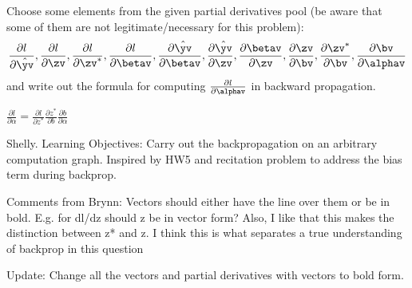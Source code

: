 \begin{parts}
Choose some elements from the given partial derivatives pool (be aware that some of them are not legitimate/necessary for this problem):\\
\begin{align*}
    \frac{\partial{l}}{\partial{\hat{\yv}}},
    \frac{\partial{l}}{\partial{\zv}},
    \frac{\partial{l}}{\partial{\zv^*}}, \frac{\partial{l}}{\partial{\betav}}, 
    \frac{\partial{\hat{\yv}}}{\partial{\betav}}, 
    \frac{\partial{\hat{\yv}}}{\partial{\zv}}, 
    \frac{\partial{\betav}}{\partial{\zv}},
    \frac{\partial{\zv}}{\partial{\bv}},
    \frac{\partial{\zv^*}}{\partial{\bv}},
    \frac{\partial{\bv}}{\partial{\alphav}}
\end{align*}
and write out the formula for computing $\frac{\partial{l}}{\partial{\alphav}} $ in backward propagation.

\begin{tcolorbox}[fit,height=3cm, width=15cm, blank, borderline={1pt}{-2pt}]

\end{tcolorbox}
\begin{soln}
    $\frac{\partial{l}}{\partial{\alpha}} = \frac{\partial{l}}{\partial{z^*}}\frac{\partial{z^*}}{\partial{b}}\frac{\partial{b}}{\partial{\alpha}}$
\end{soln}
\begin{qauthor}
   Shelly.
   Learning Objectives: Carry out the backpropagation on an arbitrary computation graph. Inspired by HW5 and recitation problem to address the bias term during backprop.
   
   Comments from Brynn: Vectors should either have the line over them or be in bold. E.g. for dl/dz should z be in vector form? Also, I like that this makes the distinction between z* and z. I think this is what separates a true understanding of backprop in this question
   
   Update: Change all the vectors and partial derivatives with vectors to bold form.
\end{qauthor}


\end{parts}
